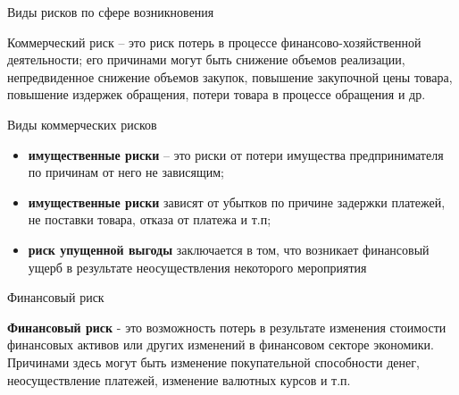 \documentclass[_fin_decisions_lectures.tex]{subfiles}
\begin{document}
\begin{frame}{Виды рисков по сфере возникновения}
\begin{block}{Коммерческий риск}
\quad– это риск потерь в процессе финансово-хозяйственной деятельности; его причинами могут быть снижение объемов реализации, непредвиденное снижение объемов закупок, повышение закупочной цены товара, повышение издержек обращения, потери товара в процессе обращения и др.
\end{block}
\end{frame}
\begin{frame}{Виды коммерческих рисков}
\begin{itemize}
	\item
	\textbf{имущественные риски }– это риски от потери имущества предпринимателя по причинам от него не зависящим;
	\item
	\textbf{имущественные риски }зависят от убытков по причине задержки платежей, не поставки товара, отказа от платежа и т.п;
	\item
	\textbf{риск упущенной выгоды }заключается в том, что возникает финансовый ущерб в результате неосуществления некоторого мероприятия
\end{itemize}
\end{frame}

\begin{frame}{Финансовый риск}
\begin{block}{\textbf{Финансовый риск}}
\quad - это возможность потерь в результате изменения стоимости финансовых активов или других изменений в финансовом секторе экономики. Причинами здесь могут быть изменение покупательной способности денег, неосуществление платежей, изменение валютных курсов и т.п.
\end{block}
\end{frame}
\end{document}
